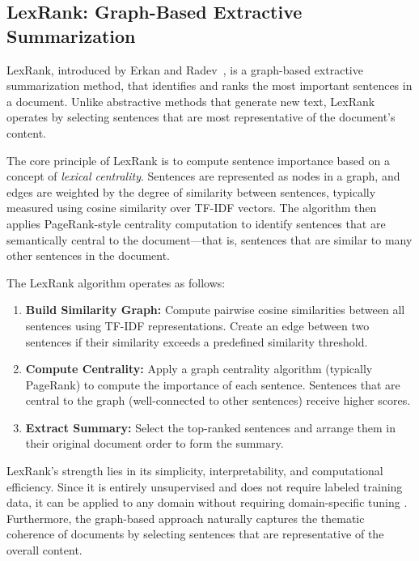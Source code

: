 \subsection{LexRank: Graph-Based Extractive Summarization}

LexRank, introduced by Erkan and Radev~\cite{erkan2004lexrank}, is a graph-based extractive summarization method, that identifies and ranks the most important sentences in a document. Unlike abstractive methods that generate new text, LexRank operates by selecting sentences that are most representative of the document's content.

The core principle of LexRank is to compute sentence importance based on a concept of \textit{lexical centrality}. Sentences are represented as nodes in a graph, and edges are weighted by the degree of similarity between sentences, typically measured using cosine similarity over TF-IDF vectors. The algorithm then applies PageRank-style centrality computation to identify sentences that are semantically central to the document—that is, sentences that are similar to many other sentences in the document.

The LexRank algorithm operates as follows:

\begin{enumerate}
    \item \textbf{Build Similarity Graph:} Compute pairwise cosine similarities between all sentences using TF-IDF representations. Create an edge between two sentences if their similarity exceeds a predefined similarity threshold.
    
    \item \textbf{Compute Centrality:} Apply a graph centrality algorithm (typically PageRank) to compute the importance of each sentence. Sentences that are central to the graph (well-connected to other sentences) receive higher scores.
    
    \item \textbf{Extract Summary:} Select the top-ranked sentences and arrange them in their original document order to form the summary.
\end{enumerate}

LexRank's strength lies in its simplicity, interpretability, and computational efficiency. Since it is entirely unsupervised and does not require labeled training data, it can be applied to any domain without requiring domain-specific tuning . Furthermore, the graph-based approach naturally captures the thematic coherence of documents by selecting sentences that are representative of the overall content.

